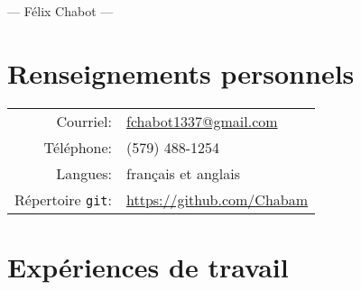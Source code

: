 \documentclass[french]{article}
\begin{document}
	\begin{center}
		{\Huge --- Félix Chabot ---}
	\end{center}

	\section{Renseignements personnels}
	\begin{tabu} to \textwidth {rX}
		Courriel: & \href{mailto:fchabot1337@gmail.com}{fchabot1337@gmail.com} \\
		Téléphone: & (579) 488-1254 \\
		Langues: & français et anglais \\
		Répertoire \texttt{git}: & \url{https://github.com/Chabam}
	\end{tabu}
	\section{Expériences de travail}
\end{document}
